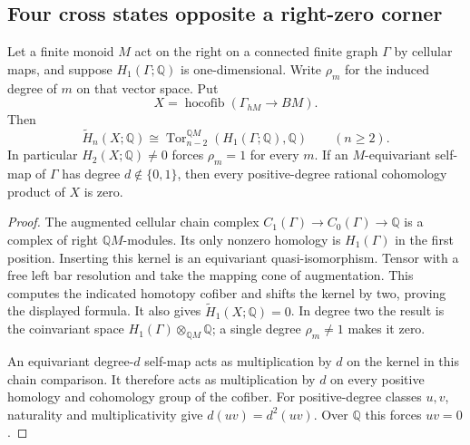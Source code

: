 \subsection{Four cross states opposite a right-zero corner}

\begin{lemma}
\label{C:connected-graph-cone-degree}
Let a finite monoid $M$ act on the right on a connected finite
graph $\Gamma$ by cellular maps, and suppose $H_1(\Gamma;\mathbb Q)$
is one-dimensional.  Write $\rho_m$ for the induced degree of
$m$ on that vector space.  Put
\[
 X=\operatorname{hocofib}(\Gamma_{hM}\longrightarrow BM).
\]
Then
\[
 \widetilde H_n(X;\mathbb Q)
   \cong\operatorname{Tor}^{\mathbb QM}_{n-2}
       (H_1(\Gamma;\mathbb Q),\mathbb Q)\qquad(n\geq2).
\]
In particular $H_2(X;\mathbb Q)\ne0$ forces $\rho_m=1$ for
every $m$.  If an $M$-equivariant self-map of $\Gamma$ has
degree $d\notin\{0,1\}$, then every positive-degree rational
cohomology product of $X$ is zero.
\end{lemma}
\begin{proof}
The augmented cellular chain complex
$C_1(\Gamma)\to C_0(\Gamma)\to\mathbb Q$ is a complex of
right $\mathbb QM$-modules.  Its only nonzero homology is
$H_1(\Gamma)$ in the first position.  Inserting this kernel is
an equivariant quasi-isomorphism.  Tensor with a free left
bar resolution and take the mapping cone of augmentation.
This computes the indicated homotopy cofiber and shifts the
kernel by two, proving the displayed formula.  It also gives
$\widetilde H_1(X;\mathbb Q)=0$.
In degree two the result is the coinvariant space
$H_1(\Gamma)\otimes_{\mathbb QM}\mathbb Q$; a single degree
$\rho_m\ne1$ makes it zero.

An equivariant degree-$d$ self-map acts as multiplication by
$d$ on the kernel in this chain comparison.  It therefore acts
as multiplication by $d$ on every positive homology and
cohomology group of the cofiber.  For positive-degree classes
$u,v$, naturality and multiplicativity give
$d(u v)=d^2(u v)$.  Over $\mathbb Q$ this forces $uv=0$.
\end{proof}

